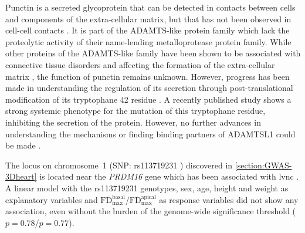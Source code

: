 %
Punctin is a secreted glycoprotein that can be detected in contacts between cells and components of the extra-cellular matrix, but that has not been observed in cell-cell contacts \citep{Hirohata2002}. It is part of the ADAMTS-like protein family which lack the proteolytic activity of their name-lending metalloprotease protein family. While other proteins of the ADAMTS-like family have been shown to be associated with connective tissue disorders and affecting the formation of the extra-cellular matrix \citep{Ahram2009,Hubmacher2015}, the function of punctin remains unknown. However, progress has been made in understanding the regulation of its secretion through post-translational modification of its tryptophane \num{42} residue \citep{Wang2009}. A recently published study shows a strong systemic phenotype for the mutation of this tryptophane residue, inhibiting the secretion of the protein. However, no further advances in understanding the mechanisms or finding binding partners of ADAMTSL1 could be made \citep{Hendee2017}.

The locus on chromosome~1 (SNP: rs113719231 ) discovered in \cref{section:GWAS-3Dheart} is located near the \textit{PRDM16} gene which has been associated with \gls{lvnc} \citep{Arndt2013}. A linear model with the rs113719231 genotypes, sex, age, height and weight as explanatory variables and \(\text{FD}_\text{max}^\text{basal}\)/\(\text{FD}_\text{max}^\text{apical}\) as response variables did not show any association, even without the burden of the genome-wide significance threshold (\(p = 0.78\)/\(p = 0.77\)).

